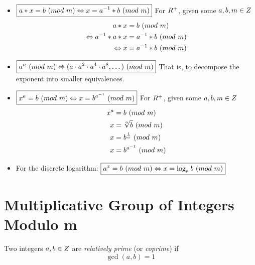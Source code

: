 \begin{itemize}
    \item $\boxed{a \ast x = b \ (\relax{mod}\ m) \Leftrightarrow x = {a}^{-1} \ast b \ (\relax{mod}\ m)}$
        \subitem For $\relax{R}^{+}$, given some $a, b, m \in \relax{Z}$
        \begin{align}
            a \ast x                                  &= b \ (\relax{mod}\ m) \\
            \Leftrightarrow {a}^{-1} \ast a \ast x &= {a}^{-1} \ast b \ (\relax{mod}\ m) \\
            \Leftrightarrow x                         &= {a}^{-1} \ast b \ (\relax{mod}\ m)
        \end{align}
    \item $\boxed{a^n \ (\relax{mod}\ m) \Leftrightarrow (a \cdot a^2 \cdot a^4 \cdot a^8, \dots) \ (\relax{mod}\ m)}$
        \subitem That is, to decompose the exponent into smaller equivalences.
    \item $\boxed{x^a = b \ (\relax{mod}\ m) \Leftrightarrow x = b^{{a}^{-1}} \ (\relax{mod}\ m)}$
        \subitem For $\relax{R}^{+}$, given some $a, b, m \in \relax{Z}$
        \begin{align}
            x^a &= b \ (\relax{mod}\ m) \\
            x   &= \sqrt[a]{b} \ (\relax{mod}\ m) \\
            x   &= b^{\frac{1}{a}} \ (\relax{mod}\ m) \\
            x   &= b^{{a}^{-1}} \ (\relax{mod}\ m)
        \end{align}
    \item For the discrete logarithm: $\boxed{a^x = b \ (\relax{mod}\ m) \Leftrightarrow x = \log_a{b} \ (\relax{mod}\ m)}$
\end{itemize}

\section{Multiplicative Group of Integers Modulo m}

\begin{definition}
    Two integers $a, b \in \relax{Z}$ are \textit{relatively prime} (or \textit{coprime}) if
    \begin{equation}
        \gcd(a, b) = 1
    \end{equation}
\end{definition}

